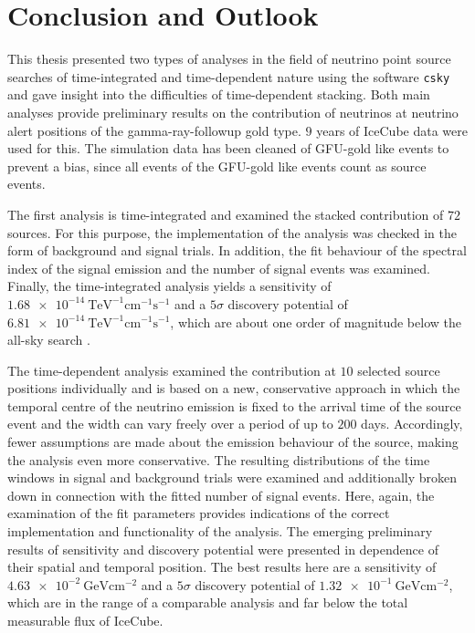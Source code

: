 \chapter{Conclusion and Outlook} \label{sec:outlook}

This thesis presented two types of analyses in the field of neutrino point source searches of time-integrated and time-dependent nature using the software \texttt{csky} and gave insight into the difficulties of time-dependent stacking.
Both main analyses provide preliminary results on the contribution of neutrinos at neutrino alert positions of the gamma-ray-followup gold type.
$\num{9}$ years of IceCube data were used for this.
The simulation data has been cleaned of GFU-gold like events to prevent a bias, since all events of the GFU-gold like events count as source events.

The first analysis is time-integrated and examined the stacked contribution of $\num{72}$ sources.
For this purpose, the implementation of the analysis was checked in the form of background and signal trials.
In addition, the fit behaviour of the spectral index of the signal emission and the number of signal events was examined.
Finally, the time-integrated analysis yields a sensitivity of $\SI{1.68e-14}{\tera\electronvolt\tothe{-1}\centi\meter\tothe{-1}\second\tothe{-1}}$ and a $\num{5}\sigma$ discovery potential of $\SI{6.81e-14}{\tera\electronvolt\tothe{-1}\centi\meter\tothe{-1}\second\tothe{-1}}$, which are about one order of magnitude below the all-sky search \cite{all_sky_paper}.

The time-dependent analysis examined the contribution at $\num{10}$ selected source positions individually and is based on a new, conservative approach in which the temporal centre of the neutrino emission is fixed to the arrival time of the source event and the width can vary freely over a period of up to $\num{200}$ days.
Accordingly, fewer assumptions are made about the emission behaviour of the source, making the analysis even more conservative.
The resulting distributions of the time windows in signal and background trials were examined and additionally broken down in connection with the fitted number of signal events.
Here, again, the examination of the fit parameters provides indications of the correct implementation and functionality of the analysis.
The emerging preliminary results of sensitivity and discovery potential were presented in dependence of their spatial and temporal position.
The best results here are a sensitivity of $\SI{4.63e-2}{\giga\electronvolt\centi\meter\tothe{-2}}$ and a $\num{5}\sigma$ discovery potential of $\SI{1.32e-1}{\giga\electronvolt\centi\meter\tothe{-2}}$, which are in the range of a comparable analysis \cite{martina} and far below the total measurable flux of IceCube.

